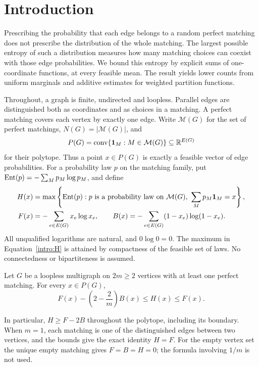 \section{Introduction}

Prescribing the probability that each edge belongs to a random perfect
matching does not prescribe the distribution of the whole matching.
The largest possible entropy of such a distribution measures how many
matching choices can coexist with those edge probabilities. We bound
this entropy by explicit sums of one-coordinate functions, at every
feasible mean. The result yields lower counts from uniform marginals
and additive estimates for weighted partition functions.

Throughout, a graph is finite, undirected and loopless. Parallel edges
are distinguished both as coordinates and as choices in a matching.
A perfect matching covers each vertex by exactly one edge. Write
$\mathcal M(G)$ for the set of perfect matchings,
$N(G)=|\mathcal M(G)|$, and
\[
 P(G)=\operatorname{conv}\{\mathbf1_M:M\in\mathcal M(G)\}\subseteq\mathbb R^{E(G)}
\]
for their polytope. Thus a point $x\in P(G)$ is exactly a feasible
vector of edge probabilities. For a probability law $p$ on the matching
family, put $\operatorname{Ent}(p)=-\sum_M p_M\log p_M$, and define
\begin{align}
 H(x)&=\max\left\{\operatorname{Ent}(p):p\text{ is a probability law on }\mathcal M(G),\
                   \sum_Mp_M\mathbf1_M=x\right\},\label{intro:H}\\
 F(x)&=-\sum_{e\in E(G)}x_e\log x_e,\qquad
 B(x)=-\sum_{e\in E(G)}(1-x_e)\log(1-x_e).
 \label{intro:FB}
\end{align}
All unqualified logarithms are natural, and $0\log0=0$.
The maximum in Equation~\eqref{intro:H} is attained by compactness
of the feasible set of laws. No connectedness or bipartiteness is assumed.

\begin{theorem}\label{ent:main}
Let $G$ be a loopless multigraph on $2m\ge2$ vertices with at least one
perfect matching. For every $x\in P(G)$,
\begin{equation}\label{intro:main-bound}
                  F(x)-\left(2-\frac2m\right)B(x)
                  \le H(x)\le F(x).
\end{equation}
\end{theorem}

In particular, $H\ge F-2B$ throughout the polytope, including its
boundary. When $m=1$, each matching is one of the distinguished edges
between two vertices, and the bounds give the exact identity $H=F$.
For the empty vertex set the unique empty matching gives $F=B=H=0$;
the formula involving $1/m$ is not used.

